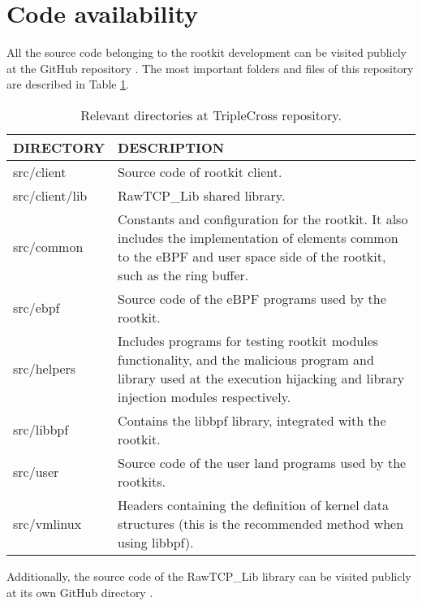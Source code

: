 \section{Code availability}
All the source code belonging to the rootkit development can be visited publicly at the GitHub repository \cite{triplecross_github}. The most important folders and files of this repository are described in Table \ref{table:triplecross_dirs}.

\begin{table}[htbp]
\begin{tabular}{|>{\centering\arraybackslash}p{4cm}|>{\centering\arraybackslash}p{10cm}|}
\hline
\textbf{DIRECTORY} & \textbf{DESCRIPTION}\\
\hline
\hline
src/client & Source code of rootkit client.\\
\hline
src/client/lib & RawTCP\_Lib shared library.\\
\hline
src/common & Constants and configuration for the rootkit. It also includes the implementation of elements common to the eBPF and user space side of the rootkit, such as the ring buffer.\\
\hline
src/ebpf & Source code of the eBPF programs used by the rootkit.\\
\hline
src/helpers & Includes programs for testing rootkit modules functionality, and the malicious program and library used at the execution hijacking and library injection modules respectively.\\
\hline
src/libbpf & Contains the libbpf library, integrated with the rootkit.\\
\hline
src/user & Source code of the user land programs used by the rootkits.\\
\hline
src/vmlinux & Headers containing the definition of kernel data structures (this is the recommended method when using libbpf).\\
\hline
\end{tabular}
\caption{Relevant directories at TripleCross repository.}
\label{table:triplecross_dirs}
\end{table} 

Additionally, the source code of the RawTCP\_Lib library can be visited publicly at its own GitHub directory \cite{rawtcp_lib}.

